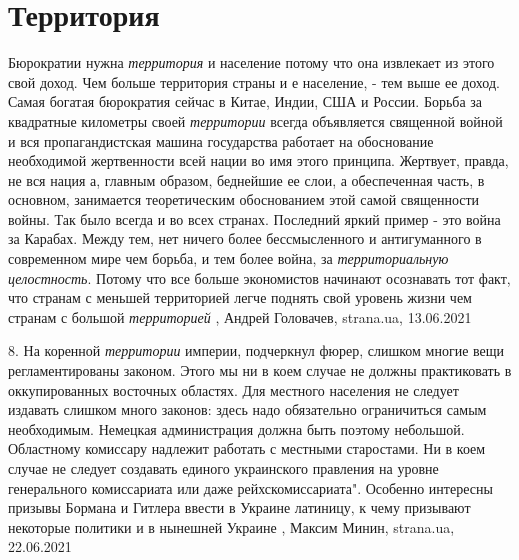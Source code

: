  
 
 
 
 
\chapter{Территория}
\label{sec:slova.territoria}

Бюрократии нужна \emph{территория} и население потому что она извлекает из этого свой
доход. Чем больше территория страны и е население, - тем выше ее доход. Самая
богатая бюрократия сейчас в Китае, Индии, США и России. Борьба за квадратные
километры своей \emph{территории} всегда объявляется священной войной и вся
пропагандистская машина государства работает на обоснование необходимой
жертвенности всей нации во имя этого принципа. Жертвует, правда, не вся нация
а, главным образом, беднейшие ее слои, а обеспеченная часть, в основном,
занимается теоретическим обоснованием этой самой священности войны. Так было
всегда и во всех странах. Последний яркий пример - это война за Карабах.  Между
тем, нет ничего более бессмысленного и антигуманного в современном мире чем
борьба, и тем более война, за \emph{территориальную целостность}. Потому что все
больше экономистов начинают осознавать тот факт, что странам с меньшей
территорией легче поднять свой уровень жизни чем странам с большой \emph{территорией}
, 
Андрей Головачев, strana.ua, 13.06.2021

8. На коренной \emph{территории} империи, подчеркнул фюрер, слишком многие вещи
регламентированы законом. Этого мы ни в коем случае не должны практиковать в
оккупированных восточных областях. Для местного населения не следует издавать
слишком много законов: здесь надо обязательно ограничиться самым необходимым.
Немецкая администрация должна быть поэтому небольшой. Областному комиссару
надлежит работать с местными старостами. Ни в коем случае не следует создавать
единого украинского правления на уровне генерального комиссариата или даже
рейхскомиссариата".
Особенно интересны призывы Бормана и Гитлера ввести в Украине латиницу, к чему
призывают некоторые политики и в нынешней Украине
, Максим Минин, strana.ua, 22.06.2021

